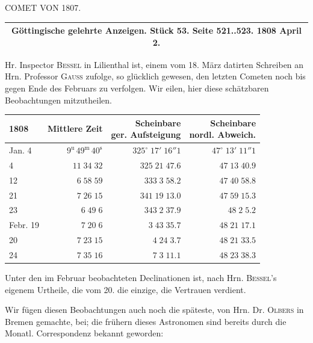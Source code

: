 \begin{center}
COMET VON 1807.
\end{center}

\begin{center}
\fontsize{10}{12}\selectfont\begin{tabular}{c}
\hline
Göttingische gelehrte Anzeigen. Stück 53. Seite 521..523. 1808 April 2. \\
\hline
\end{tabular}
\end{center}

Hr. Inspector \textsc{Bessel} in Lilienthal ist, einem vom 18. März datirten Schreiben an Hrn.
Professor \textsc{Gauss} zufolge, so glücklich gewesen, den letzten Cometen noch bis gegen Ende
des Februars zu verfolgen. Wir eilen, hier diese schätzbaren Beobachtungen mitzutheilen.


\begin{center}\fontsize{10}{12}\selectfont\setlength{\tabcolsep}{3pt}\renewcommand{\arraystretch}{1.15}\begin{tabular}{lrrr}
1808 & Mittlere Zeit & \shortstack{Scheinbare\\ger. Aufsteigung} & \shortstack{Scheinbare\\nordl. Abweich.}\\\hline
Jan. 4 & $9^{\text{u}}\,49^{\text{m}}\,40^{\text{s}}$ & $325^\circ\;17'\;16''1$ & $47^\circ\;13'\;11''1$\\
4 & $11\;34\;32$ & $325\;21\;47.6$ & $47\;13\;40.9$\\
12 & $6\;58\;59$ & $333\;3\;58.2$ & $47\;40\;58.8$\\
21 & $7\;26\;15$ & $341\;19\;13.0$ & $47\;59\;15.3$\\
23 & $6\;49\;6$ & $343\;2\;37.9$ & $48\;2\;5.2$\\
Febr. 19 & $7\;20\;6$ & $3\;43\;35.7$ & $48\;21\;17.1$\\
20 & $7\;23\;15$ & $4\;24\;3.7$ & $48\;21\;33.5$\\
24 & $7\;35\;16$ & $7\;3\;11.1$ & $48\;23\;38.3$\\
\end{tabular}\end{center}

\par\indent Unter den im Februar beobachteten Declinationen ist, nach Hrn. \textsc{Bessel}'s eigenem Urtheile,
die vom 20. die einzige, die Vertrauen verdient.

Wir fügen diesen Beobachtungen auch noch die späteste, von Hrn. Dr. \textsc{Olbers} in Bremen
gemachte, bei; die frühern dieses Astronomen sind bereits durch die Monatl. Correspondenz
bekannt geworden:

